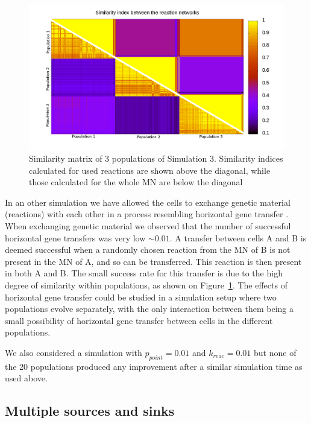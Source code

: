 \documentclass[a4paper,12pt]{article}
\begin{document}
\begin{figure}[htpb]
	\centering
	\includegraphics[width=0.8\linewidth]{simmatrix_sim3.png}
	\caption{Similarity matrix of 3 populations of Simulation 3. Similarity indices calculated for used reactions are shown above the diagonal, while those calculated for the whole MN are below the diagonal}
	\label{fig:simmatrix_sim3}
\end{figure}


In an other simulation we have allowed the cells to exchange genetic material (reactions) with each other in a process resembling horizontal gene transfer \cite{horizontalgenetransfer}. When exchanging genetic material we observed that the number of successful horizontal gene transfers was very low $\sim 0.01$. A transfer between cells A and B is deemed successful when a randomly chosen reaction from the MN of B is not present in the MN of A, and so can be transferred. This reaction is then present in both A and B. The small success rate for this transfer is due to the high degree of similarity within populations, as shown on Figure~\ref{fig:simmatrix_sim3}. The effects of horizontal gene transfer could be studied in a simulation setup where two populations evolve separately, with the only interaction between them being a small possibility of horizontal gene transfer between cells in the different populations. %

We also considered a simulation with $p_{point}=0.01$ and $k_{reac}=0.01$ but none of the 20 populations produced any improvement after a similar simulation time as used above. 




\subsection{Multiple sources and sinks}
\label{sub:multiple_sources_and_sinks}
\end{document}
